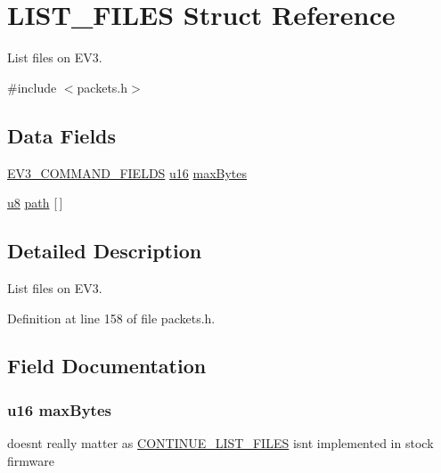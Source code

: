 \hypertarget{struct_l_i_s_t___f_i_l_e_s}{}\section{L\+I\+S\+T\+\_\+\+F\+I\+L\+E\+S Struct Reference}
\label{struct_l_i_s_t___f_i_l_e_s}


List files on E\+V3.  




{\ttfamily \#include $<$packets.\+h$>$}

\subsection*{Data Fields}
\begin{DoxyCompactItemize}
\item 
\hyperlink{packets_8h_a0c26a010ef0da2962a751796943824c9}{E\+V3\+\_\+\+C\+O\+M\+M\+A\+N\+D\+\_\+\+F\+I\+E\+L\+D\+S} \hyperlink{defs_8h_ace9d960e74685e2cd84b36132dbbf8aa}{u16} \hyperlink{struct_l_i_s_t___f_i_l_e_s_ab90bb8e65738c294ff6c9400ea3f4b41}{max\+Bytes}
\item 
\hyperlink{defs_8h_a92c50087ca0e64fa93fc59402c55f8ca}{u8} \hyperlink{struct_l_i_s_t___f_i_l_e_s_a5b52bf017932056c1f97b175be6bd8b1}{path} \mbox{[}$\,$\mbox{]}
\end{DoxyCompactItemize}


\subsection{Detailed Description}
List files on E\+V3. 

Definition at line 158 of file packets.\+h.



\subsection{Field Documentation}
\hypertarget{struct_l_i_s_t___f_i_l_e_s_ab90bb8e65738c294ff6c9400ea3f4b41}{}
\subsubsection[{max\+Bytes}]{ {\bf u16} max\+Bytes}\label{struct_l_i_s_t___f_i_l_e_s_ab90bb8e65738c294ff6c9400ea3f4b41}
doesn\textquotesingle{}t really matter as \hyperlink{struct_c_o_n_t_i_n_u_e___l_i_s_t___f_i_l_e_s}{C\+O\+N\+T\+I\+N\+U\+E\+\_\+\+L\+I\+S\+T\+\_\+\+F\+I\+L\+E\+S} isn\textquotesingle{}t implemented in stock firmware 

